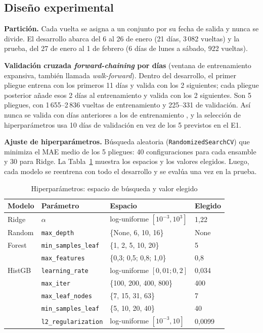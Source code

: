\documentclass[conference,spanish]{IEEEtran}
\begin{document}
\subsection{Diseño experimental}
\textbf{Partición.} Cada vuelta se asigna a un conjunto por su fecha de salida y nunca se divide. El desarrollo abarca del 6 al 26 de enero (21 días, 3\,082 vueltas) y la prueba, del 27 de enero al 1 de febrero (6 días de lunes a sábado, 922 vueltas).

\textbf{Validación cruzada \textit{forward-chaining} por días} (ventana de entrenamiento expansiva, también llamada \textit{walk-forward}). Dentro del desarrollo, el primer pliegue entrena con los primeros 11 días y valida con los 2 siguientes; cada pliegue posterior añade esos 2 días al entrenamiento y valida con los 2 siguientes. Son 5 pliegues, con 1\,655--2\,836 vueltas de entrenamiento y 225--331 de validación. Así nunca se valida con días anteriores a los de entrenamiento \cite{bergmeir2012}, y la selección de hiperparámetros usa 10 días de validación en vez de los 5 previstos en el E1.

\textbf{Ajuste de hiperparámetros.} Búsqueda aleatoria (\texttt{RandomizedSearchCV}) que minimiza el MAE medio de los 5 pliegues: 40 configuraciones para cada ensamble y 30 para Ridge. La Tabla~\ref{tab:hiper} muestra los espacios y los valores elegidos. Luego, cada modelo se reentrena con todo el desarrollo y se evalúa una vez en la prueba.

\begin{table}[h]
\centering
\caption{Hiperparámetros: espacio de búsqueda y valor elegido}
\label{tab:hiper}
\scriptsize
\begin{tabular}{@{}p{1.1cm}p{2.8cm}p{2.6cm}p{0.9cm}@{}}
\toprule
\textbf{Modelo} & \textbf{Parámetro} & \textbf{Espacio} & \textbf{Elegido}\\
\midrule
Ridge & $\alpha$ & log-uniforme $[10^{-3},10^{3}]$ & 1,22\\
\midrule
Random & \texttt{max\_depth} & \{None, 6, 10, 16\} & None\\
Forest & \texttt{min\_samples\_leaf} & \{1, 2, 5, 10, 20\} & 5\\
 & \texttt{max\_features} & \{0,3; 0,5; 0,8; 1,0\} & 0,8\\
\midrule
HistGB & \texttt{learning\_rate} & log-uniforme $[0{,}01;0{,}2]$ & 0,034\\
 & \texttt{max\_iter} & \{100, 200, 400, 800\} & 400\\
 & \texttt{max\_leaf\_nodes} & \{7, 15, 31, 63\} & 7\\
 & \texttt{min\_samples\_leaf} & \{5, 10, 20, 40\} & 40\\
 & \texttt{l2\_regularization} & log-uniforme $[10^{-3},10]$ & 0,0099\\
\bottomrule
\end{tabular}
\end{table}
\end{document}
